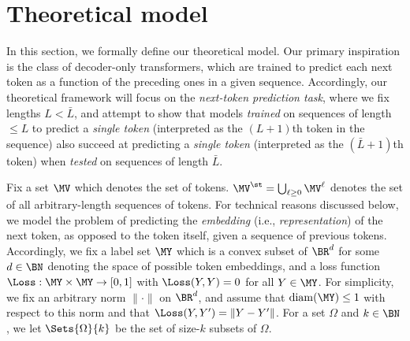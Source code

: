 \documentclass{article}
\newcommand{\arxiv}[1]{\iftoggle{icml}{}{#1}}
\begin{document}
\section{Theoretical model}
\label{sec:model}
\arxiv{\paragraph{Overview.}} In this section, we formally define our theoretical model. Our primary inspiration is the class of decoder-only transformers, which are trained to predict each next token as a function of the preceding ones in a given sequence. %
Accordingly, our theoretical framework will focus on the \emph{next-token prediction task}, where we fix lengths $L < \bar L$, and attempt to show that models \emph{trained} on sequences of length $\leq L$ to predict a \emph{single token} (interpreted as the $(L+1)$th token in the sequence) also succeed at predicting a \emph{single token} (interpreted as the $(\bar L+1)$th token) when \emph{tested} on sequences of length $\bar L$. 
\arxiv{To do so, we will have to make two types of assumptions.  First, in \cref{sec:sparse-structure} we make the following assumption on the distributions of the sequences: roughly speaking, there is always a short subsequence which is sufficient for predicting the token in question. Second, in \cref{sec:hypothesis-classes}, we assume that the learning algorithm is performing risk minimization with respect to a certain hypothesis class generalizing the class of attention heads. }%

\arxiv{\paragraph{Basic setup.}} Fix a set $\MV$ which denotes the set of tokens. $\MV^\st = \bigcup_{\ell \geq 0} \MV^\ell$ denotes the set of all arbitrary-length sequences of tokens.  For technical reasons discussed below, we model the problem of predicting the \emph{embedding} (i.e., \emph{representation}) of the next token, as opposed to the token itself, given a sequence of previous tokens. Accordingly, we fix a label set $\MY$ which is a convex subset of $\BR^d$ for some $d \in \BN$ denoting the space of possible token embeddings, and a loss function $\Loss : \MY \times \MY \to [0,1]$ with $\Loss(Y, Y) = 0$ for all $Y \in \MY$. %
For simplicity, we fix an arbitrary norm $\| \cdot \|$ on $\BR^d$, and assume that  $\mathrm{diam}(\MY) \leq 1$ with respect to this norm and that $\Loss(Y, Y') = \| Y - Y'\|$. %
 For a set $\Omega$ and $k \in \BN$, we let $\Sets{\Omega}{k}$ be the set of size-$k$ subsets of $\Omega$. 
\end{document}
